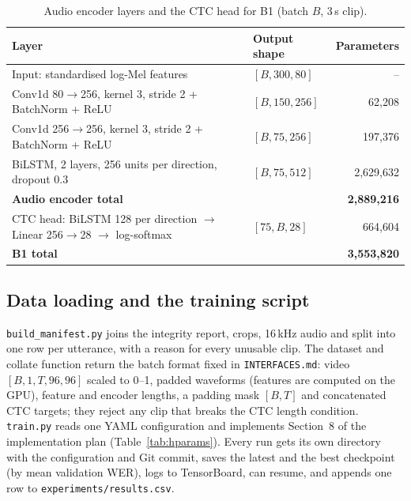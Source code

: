 \documentclass[11pt,a4paper]{article}
\newcommand{\code}[1]{\texttt{\small #1}}
\begin{document}
\begin{table}[htbp]
\centering\small
\caption{Audio encoder layers and the CTC head for B1 (batch $B$, 3\,s clip).}
\label{tab:encoder}
\begin{tabularx}{\textwidth}{@{}XL{3.0cm}r@{}}
\toprule
{}\sffamily\bfseries Layer & \sffamily\bfseries Output shape & \sffamily\bfseries Parameters \\
\midrule
Input: standardised log-Mel features & $[B, 300, 80]$ & -- \\
Conv1d 80$\to$256, kernel 3, stride 2 + BatchNorm + ReLU & $[B, 150, 256]$ & 62,208 \\
Conv1d 256$\to$256, kernel 3, stride 2 + BatchNorm + ReLU & $[B, 75, 256]$ & 197,376 \\
BiLSTM, 2 layers, 256 units per direction, dropout 0.3 & $[B, 75, 512]$ & 2,629,632 \\
\textbf{Audio encoder total} & & \textbf{2,889,216} \\
CTC head: BiLSTM 128 per direction $\to$ Linear 256$\to$28 $\to$ log-softmax & $[75, B, 28]$ & 664,604 \\
\textbf{B1 total} & & \textbf{3,553,820} \\
\bottomrule
\end{tabularx}
\end{table}

\subsection{Data loading and the training script}
\code{build\_manifest.py} joins the integrity report, crops, 16\,kHz audio and
split into one row per utterance, with a reason for every unusable clip. The
dataset and collate function return the batch format fixed in
\code{INTERFACES.md}: video $[B, 1, T, 96, 96]$ scaled to 0--1, padded
waveforms (features are computed on the GPU), feature and encoder lengths, a
padding mask $[B, T]$ and concatenated CTC targets; they reject any clip that
breaks the CTC length condition. \code{train.py} reads one YAML configuration
and implements Section~8 of the implementation plan (Table~\ref{tab:hparams}).
Every run gets its own directory with the configuration and Git commit, saves
the latest and the best checkpoint (by mean validation WER), logs to
TensorBoard, can resume, and appends one row to \code{experiments/results.csv}.
\end{document}
